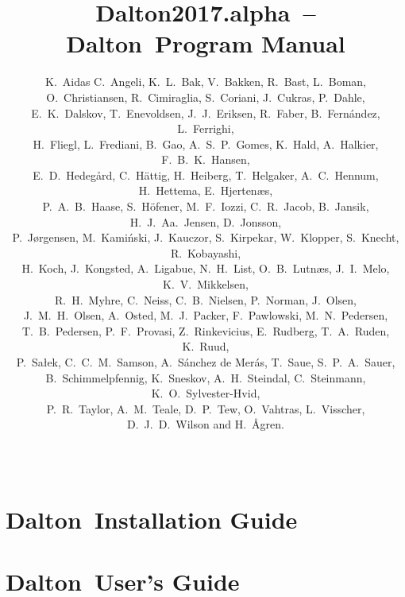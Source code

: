 \documentclass[11pt]{report}
\newcommand{\latestrelease}{Dalton2017.alpha}
\newcommand{\dalton}{{\sc Dalton}}
\begin{document}
\nobibliography*
%
%
\baselineskip=15pt
%
\title{\latestrelease\ -- \dalton\ Program Manual}

%
\author{
K.~Aidas
C.~Angeli,
K.~L.~Bak,
V.~Bakken,
R.~Bast,
L.~Boman,\\
O.~Christiansen,
R.~Cimiraglia,
S.~Coriani,
J.~Cukras,
P.~Dahle,\\
E.~K.~Dalskov,
T.~Enevoldsen,
J.~J.~Eriksen,
R.~Faber,
B.~Fern\'{a}ndez,
L.~Ferrighi,\\
H.~Fliegl,
L.~Frediani,
B.~Gao,
A.~S.~P.~Gomes,
K.~Hald,
A.~Halkier,
F.~B.~K.~Hansen, \\
E.~D.~Hedeg\aa{}rd,
C.~H{\"a}ttig,
H.~Heiberg,
T.~Helgaker,
A.~C.~Hennum,
H.~Hettema,
E.~Hjerten\ae{}s, \\
P.~A.~B.~Haase,
S.~H{\"o}fener,
M.~F.~Iozzi,
C.~R.~Jacob,
B.~Jansik,
H.~J.~Aa.~Jensen,
D.~Jonsson, \\
P.~J{\o}rgensen,
M.~Kami{\'n}ski,
J.~Kauczor,
S.~Kirpekar,
W.~Klopper,
S.~Knecht,
R.~Kobayashi, \\
H.~Koch, 
J.~Kongsted,
A.~Ligabue,
N.~H.~List,
O.~B.~Lutn\ae{}s,
J.~I.~Melo,
K.~V.~Mikkelsen, \\
R.~H.~Myhre,
C.~Neiss,
C.~B.~Nielsen,
P.~Norman,
J.~Olsen, \\
J.~M.~H.~Olsen,
A.~Osted,
M.~J.~Packer,
F.~Pawlowski,
M.~N.~Pedersen, \\
T.~B.~Pedersen,
P.~F.~Provasi,
Z.~Rinkevicius,
E.~Rudberg,
T.~A.~Ruden,
K.~Ruud, \\
P.~Sa\l{}ek,
C.~C.~M.~Samson,
A.~S\'{a}nchez de Mer\'{a}s,
T.~Saue,
S.~P.~A.~Sauer, \\
B.~Schimmelpfennig,
K.~Sneskov,
A.~H.~Steindal,
C.~Steinmann,
K.~O.~Sylvester-Hvid, \\
P.~R.~Taylor,
A.~M.~Teale,
D.~P.~Tew,
O.~Vahtras,
L.~Visscher,
D.~J.~D.~Wilson
and H.~{\AA}gren.
}
%
\date{\mbox{\ }}
%
\maketitle
%


%
\part{\dalton\ Installation Guide}


\part{\dalton\ User's Guide}





















\end{document}
